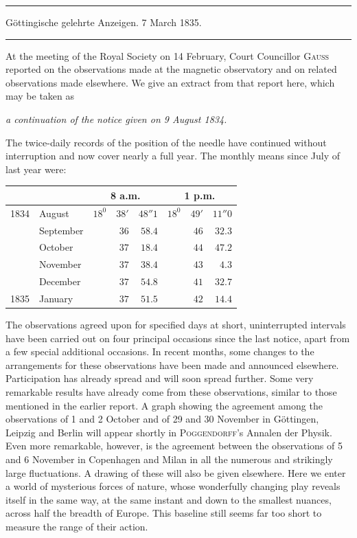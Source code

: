 \begin{samepage}
\bigskip
{}
\begin{center}
\hrule\vspace{2mm}
Göttingische gelehrte Anzeigen. 7 March 1835.
\vspace{2mm}\hrule\vspace{5mm}
\end{center}
At the meeting of the Royal Society on 14 February, Court Councillor \textsc{Gauss} reported on the observations made at the magnetic observatory and on related observations made elsewhere. We give an extract from that report here, which may be taken as
\begin{center}\itshape a continuation of the notice given on 9 August 1834.\end{center}
\end{samepage}

The twice-daily records of the position of the needle have continued without interruption and now cover nearly a full year. The monthly means since July of last year were:
\begin{center}
\begin{tabular}{rl|rrr|rrr}
 & & \multicolumn{3}{c|}{8 a.m.} & \multicolumn{3}{c}{1 p.m.}\\\hline
1834 & August & $18^0$ & $38'$ & $48''1$ & $18^0$ & $49'$ & $11''0$\\
 & September & & $36$ & $58.4$ & & $46$ & $32.3$\\
 & October & & $37$ & $18.4$ & & $44$ & $47.2$\\
 & November & & $37$ & $38.4$ & & $43$ & $4.3$\\
 & December & & $37$ & $54.8$ & & $41$ & $32.7$\\
1835 & January & & $37$ & $51.5$ & & $42$ & $14.4$
\end{tabular}
\end{center}

The observations agreed upon for specified days at short, uninterrupted intervals have been carried out on four principal occasions since the last notice, apart from a few special additional occasions. In recent months, some changes to the arrangements for these observations have been made and announced elsewhere. Participation has already spread and will soon spread further. Some very remarkable results have already come from these observations, similar to those mentioned in the earlier report. A graph showing the agreement among the observations of 1 and 2 October and of 29 and 30 November in Göttingen, Leipzig and Berlin will appear shortly in \textsc{Poggendorff}'s Annalen der Physik. Even more remarkable, however, is the agreement between the observations of 5 and 6 November in Copenhagen and Milan in all the numerous and strikingly large fluctuations. A drawing of these will also be given elsewhere. Here we enter a world of mysterious forces of nature, whose wonderfully changing play reveals itself in the same way, at the same instant and down to the smallest nuances, across half the breadth of Europe. This baseline still seems far too short to measure the range of their action.

